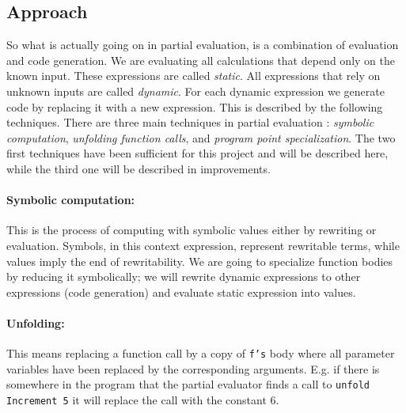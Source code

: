 \subsection{Approach}
So what is actually going on in partial evaluation, is a combination of evaluation and code generation. We are evaluating all calculations that depend only on the known input. These expressions are called \textit{static}. All expressions that rely on unknown inputs are called \textit{dynamic}. For each dynamic expression we generate code by replacing it with a new expression. This is described by the following techniques. 
There are three main techniques in partial evaluation \cite{Sestoft}: \textit{symbolic computation}, \textit{unfolding function calls}, and \textit{program point specialization}. The two first techniques have been sufficient for this project and will be described here, while the third one will be described in improvements.
\paragraph{Symbolic computation:} This is the process of computing with symbolic values either by rewriting or evaluation. Symbols, in this context expression, represent rewritable terms, while values imply the end of rewritability. We are going to specialize function bodies by reducing it symbolically; we will rewrite dynamic expressions to other expressions (code generation) and evaluate static expression into values.
\paragraph{Unfolding:} This means replacing a function call by a copy of \texttt{f's} body where all parameter variables have been replaced by the corresponding arguments. E.g. if there is somewhere in the program that the partial evaluator finds a call to \texttt{unfold Increment 5} it will replace the call with the constant 6.
